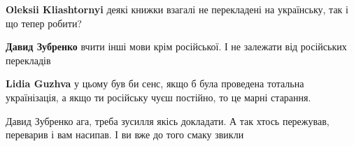  
 
 
 
 

\begin{itemize}
	
 
\textbf{Oleksii Kliashtornyi} деякі книжки взагалі не перекладені на українську, так і що тепер робити?

 
\textbf{Давид Зубренко} вчити інші мови крім російської. І не залежати від російських перекладів

 
\textbf{Lidia Guzhva} у цьому був би сенс, якщо б була проведена тотальна українізація, а якщо ти російську чуєш постійно, то це марні старання.

 
Давид Зубренко ага, треба зусилля якісь докладати. А так хтось пережував, переварив і вам насипав. І ви вже до того смаку звикли

 

\end{itemize}
